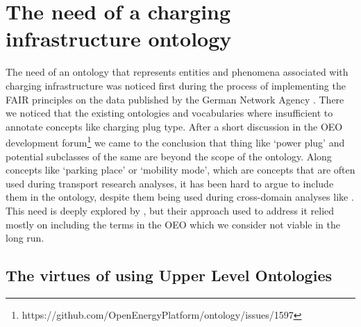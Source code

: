 ﻿\section{The need of a charging infrastructure ontology}

The need of an ontology that represents entities and phenomena associated with
charging infrastructure was noticed first during the process of implementing
the FAIR principles on the data published by the German Network Agency
\cite{ArellanoRuiz.2024}. There we noticed that the existing ontologies and
vocabularies where insufficient to annotate concepts like charging plug type.
After a short discussion in the OEO development
forum\footnote{https://github.com/OpenEnergyPlatform/ontology/issues/1597} we
came to the conclusion that thing like `power plug' and potential subclasses
of the same are beyond the scope of the ontology. Along concepts like `parking
place' or `mobility mode', which are concepts that are often used during
transport research analyses, it has been hard to argue to include them in the
ontology, despite them being used during cross-domain analyses like
\cite{Hecht.2022}. This need is deeply explored by \cite{Mittermeier.2023}, but
their approach used to address it relied mostly on including the terms in the
OEO which we consider not viable in the long run.

\subsection{The virtues of using Upper Level Ontologies}

